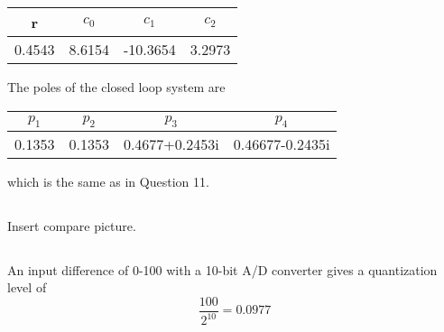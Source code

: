\documentclass[12pt,a4paper]{article}
\begin{document}
\begin{center}
	\begin{tabular}{| c | c | c | c |}
	\hline
	r & $c_0$ & $c_1$ & $c_2$ \\
	\hline
	0.4543 & 8.6154 & -10.3654 & 3.2973 \\
	\hline
	\end{tabular}
\end{center}

The poles of the closed loop system are
\begin{center}
	\begin{tabular}{| c | c | c | c |}
	\hline
	$p_1$ & $p_2$ & $p_3$ & $p_4$ \\
	\hline
	0.1353 & 0.1353 & 0.4677+0.2453i & 0.46677-0.2435i\\
	\hline
	\end{tabular}
\end{center}
which is the same as in Question 11.

\subsection{}%
Insert compare picture.

\subsection{}%
An input difference of 0-100 with a 10-bit A/D converter gives a quantization level of
\begin{equation}
	\frac{100}{2^{10}} = 0.0977
\end{equation}
\end{document}
